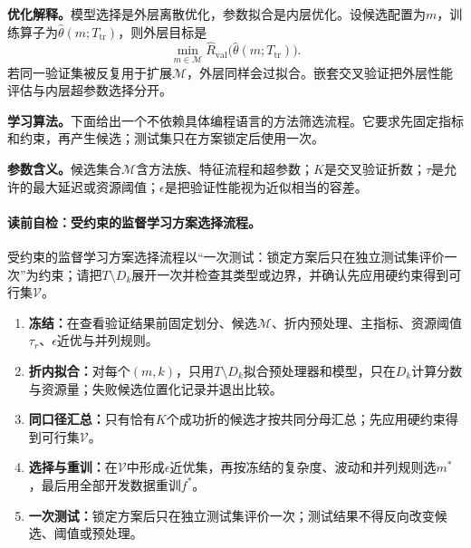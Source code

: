 \label{struct:V3-C07-CH16}
\textbf{优化解释。}模型选择是外层离散优化，参数拟合是内层优化。设候选配置为$m$，训练算子为$\widehat\theta(m;T_{\mathrm{tr}})$，则外层目标是
\[
\min_{m\in\mathcal M}
\widehat R_{\mathrm{val}}
\bigl(\widehat\theta(m;T_{\mathrm{tr}})\bigr).
\]
若同一验证集被反复用于扩展$\mathcal M$，外层同样会过拟合。嵌套交叉验证把外层性能评估与内层超参数选择分开。

\label{struct:V3-C07-CH10}
\textbf{学习算法。}下面给出一个不依赖具体编程语言的方法筛选流程。它要求先固定指标和约束，再产生候选；测试集只在方案锁定后使用一次。

\label{struct:V3-C07-CH21}
\textbf{参数含义。}候选集合$\mathcal M$含方法族、特征流程和超参数；$K$是交叉验证折数；$\tau$是允许的最大延迟或资源阈值；$\epsilon$是把验证性能视为近似相当的容差。

\label{struct:V3-C07-CH19}
\label{struct:V3-C07-CH20}
\label{struct:V3-C07-CH22}
\label{struct:V3-C07-CH23}
\label{struct:V3-C07-CH24}
\label{struct:V3-C07-CH25}
\paragraph{读前自检：受约束的监督学习方案选择流程。}受约束的监督学习方案选择流程以“一次测试：锁定方案后只在独立测试集评价一次”为约束；请把$T\setminus D_k$展开一次并检查其类型或边界，并确认先应用硬约束得到可行集$\mathcal V$。\par

\begin{keypointbox}[title=受约束的监督学习方案选择流程]
\label{alg:V3-C07-selection}
\begin{enumerate}[leftmargin=2.2em,nosep]
  \item \textbf{冻结：}在查看验证结果前固定\kFold{}划分、候选$\mathcal M$、折内预处理、主指标、资源阈值$\tau_r$、$\epsilon$近优与并列规则。
  \item \textbf{折内拟合：}对每个$(m,k)$，只用$T\setminus D_k$拟合预处理器和模型，只在$D_k$计算分数与资源量；失败候选位置化记录并退出比较。
  \item \textbf{同口径汇总：}只有恰有$K$个成功折的候选才按共同分母汇总；先应用硬约束得到可行集$\mathcal V$。
  \item \textbf{选择与重训：}在$\mathcal V$中形成$\epsilon$近优集，再按冻结的复杂度、波动和并列规则选$m^*$，最后用全部开发数据重训$f^*$。
  \item \textbf{一次测试：}锁定方案后只在独立测试集评价一次；测试结果不得反向改变候选、阈值或预处理。
\end{enumerate}
\end{keypointbox}

